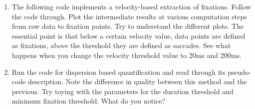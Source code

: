 \documentclass[12pt,english]{scrartcl}
\begin{document}
\begin{enumerate}
 \color{black}
 \item The following code implements a velocity-based extraction of fixations. Follow the code through. Plot the intermediate results at various computation  steps from raw data to fixation points. Try to understand the different plots. The essential point is that below a certain velocity value, data points are defined as fixations, above the threshold they are defined as saccades. See what happens when you change the velocity threshold value to 20ms and 200ms.\\
 
 
 \color{black}
 \item Run the code for dispersion based quantification and read through its pseudo-code description. Note the difference in quality between this method and the previous. Try toying with the parameters for the duration threshold and minimum fixation threshold. What do you notice? 
%  
%   

 \end{enumerate}
 \color{black}
\end{document}
